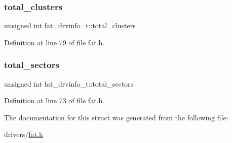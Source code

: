 \subsubsection{\texorpdfstring{total\+\_\+clusters}{total\_clusters}}
{\footnotesize\ttfamily unsigned int fat\+\_\+drvinfo\+\_\+t\+::total\+\_\+clusters}



Definition at line 79 of file fat.\+h.

\mbox{\label{structfat__drvinfo__t_a47d5e31a3e5c6c314f49705a3961f7ea_a47d5e31a3e5c6c314f49705a3961f7ea}} 
\subsubsection{\texorpdfstring{total\+\_\+sectors}{total\_sectors}}
{\footnotesize\ttfamily unsigned int fat\+\_\+drvinfo\+\_\+t\+::total\+\_\+sectors}



Definition at line 73 of file fat.\+h.



The documentation for this struct was generated from the following file\+:\begin{DoxyCompactItemize}
\item 
drivers/\hyperlink{fat_8h}{fat.\+h}\end{DoxyCompactItemize}
